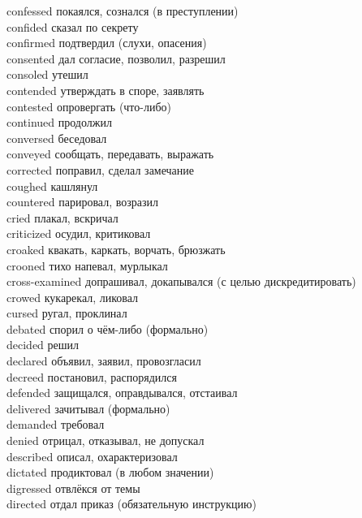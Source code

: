 \documentclass[a4paper,12pt,fleqn]{book}\usepackage{cooltooltips}\usepackage{polyglossia}\setdefaultlanguage[babelshorthands=true]{russian}\setotherlanguage{english}\defaultfontfeatures{Ligatures=TeX,Mapping=tex-text} \usepackage{xcolor}\definecolor{lightgray}{HTML}{bbbbbb}\color{lightgray}\newcommand{\ml}[3]{\textenglish{\textcolor{black}{#3}}}
\begin{document}
{confessed \hfill покаялся, сознался (в преступлении)\\
confided \hfill сказал по секрету\\
confirmed \hfill подтвердил (слухи, опасения)\\
consented \hfill дал согласие, позволил, разрешил\\
consoled \hfill утешил\\
contended \hfill утверждать в споре, заявлять\\
contested \hfill опровергать (что-либо)\\
continued \hfill продолжил\\
conversed \hfill беседовал\\
conveyed \hfill сообщать, передавать, выражать\\
corrected \hfill поправил, сделал замечание\\
coughed \hfill кашлянул\\
countered \hfill парировал, возразил\\
cried \hfill плакал, вскричал\\
criticized \hfill осудил, критиковал\\
croaked \hfill квакать, каркать, ворчать, брюзжать\\
crooned \hfill тихо напевал, мурлыкал\\
cross-examined \hfill допрашивал, докапывался (с целью дискредитировать)\\
crowed \hfill кукарекал, ликовал\\
cursed \hfill ругал, проклинал\\
debated \hfill спорил о чём-либо (формально)\\
decided \hfill решил\\
declared \hfill объявил, заявил, провозгласил\\
decreed \hfill постановил, распорядился\\
defended \hfill защищался, оправдывался, отстаивал\\
delivered \hfill зачитывал (формально)\\
demanded \hfill требовал\\
denied \hfill отрицал, отказывал, не допускал\\
described \hfill описал, охарактеризовал\\
dictated \hfill продиктовал (в любом значении)\\
digressed \hfill отвлёкся от темы\\
directed \hfill отдал приказ (обязательную инструкцию)\\
}
\end{document}
